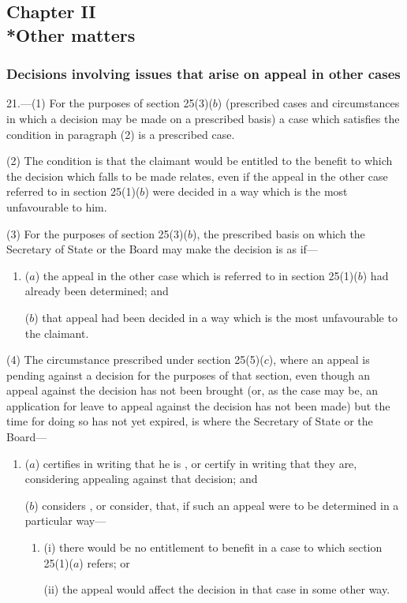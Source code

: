 \documentclass[12pt,a4paper]{article}
\begin{document}
\subsection[Chapter II --- Other matters]{Chapter II\\*Other matters}

\subsubsection[21. Decisions involving issues that arise on appeal in other cases]{Decisions involving issues that arise on appeal in other cases}

\renewcommand\parthead{--- Part III Chapter II}

21.—(1) For the purposes of section 25(3)($b$) (prescribed cases and circumstances in which a decision may be made on a prescribed basis) a case which satisfies the condition in paragraph (2) is a prescribed case.

(2) The condition is that the claimant would be entitled to the benefit to which the decision which falls to be made relates, even if the appeal in the other case referred to in section 25(1)($b$) were decided in a way which is the most unfavourable to him.

(3) For the purposes of section 25(3)($b$), the prescribed basis on which the Secretary of State 
or the Board  %
may make the decision is as if—
\begin{enumerate}\item[]
($a$) the appeal in the other case which is referred to in section 25(1)($b$) had already been determined; and

($b$) that appeal had been decided in a way which is the most unfavourable to the claimant.
\end{enumerate}

(4) The circumstance prescribed under section 25(5)($c$), where an appeal is pending against a decision for the purposes of that section, even though an appeal against the decision has not been brought (or, as the case may be, an application for leave to appeal against the decision has not been made) but the time for doing so has not yet expired, is where the Secretary of State
or the Board—  %
\begin{enumerate}\item[]
($a$) certifies in writing that he is%
, or certify in writing that they are,  %
considering appealing against that decision; and

($b$) considers%
, or consider,  %
that, if such an appeal were to be determined in a particular way—
\begin{enumerate}\item[]
(i) there would be no entitlement to benefit in a case to which section 25(1)($a$) refers; or

(ii) the appeal would affect the decision in that case in some other way.
\end{enumerate}
\end{enumerate}
\end{document}
